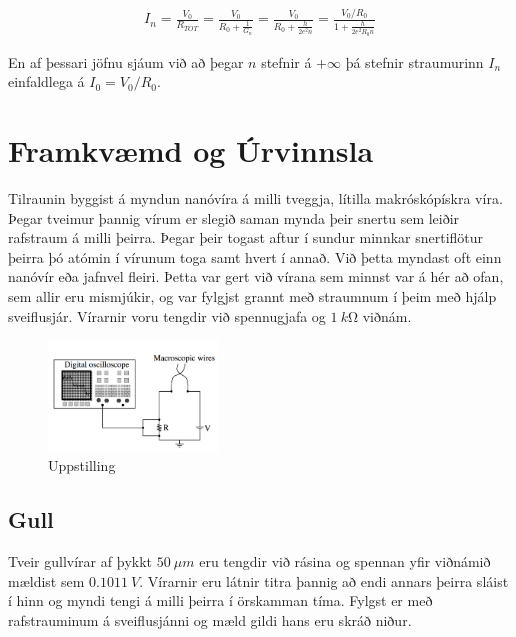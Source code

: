 \documentclass[11pt]{article}
\begin{document}
\begin{align}
I_n = \frac{V_0}{R_{TOT}} = \frac{V_0}{R_0 + \frac{1}{G_n}} = \frac{V_0}{R_0 + \frac{h}{2e^2 n}} = \frac{V_0 / R_0}{1 + \frac{h}{2e^2 R_0 n}}
\end{align}

En af þessari jöfnu sjáum við að þegar $n$ stefnir á $+\infty$ þá stefnir straumurinn $I_n$ einfaldlega á $I_0 = V_0 / R_0$.

\section{Framkvæmd og Úrvinnsla}
Tilraunin byggist á myndun nanóvíra á milli tveggja, lítilla makróskópískra víra. Þegar tveimur þannig vírum er slegið saman mynda þeir snertu sem leiðir rafstraum á milli þeirra. Þegar þeir togast aftur í sundur minnkar snertiflötur þeirra þó atómin í vírunum toga samt hvert í annað. Við þetta myndast oft einn nanóvír eða jafnvel fleiri. Þetta var gert við vírana sem minnst var á hér að ofan, sem allir eru mismjúkir, og var fylgjst grannt með straumnum í þeim með hjálp sveiflusjár. Vírarnir voru tengdir við spennugjafa og $\SI{1}{k \ohm}$ viðnám.
\begin{figure}[H]
    \centering
    \includegraphics[width=0.4\textwidth]{leidni_skyring.PNG}
    \caption{Uppstilling}
    \label{fig:uppstilling}
\end{figure}

\subsection{Gull}
Tveir gullvírar af þykkt $\SI{50}{\mu m}$ eru tengdir við rásina og spennan yfir viðnámið mældist sem $\SI{0.1011}{V}$. Vírarnir eru látnir titra þannig að endi annars þeirra sláist í hinn og myndi tengi á milli þeirra í örskamman tíma. Fylgst er með rafstrauminum á sveiflusjánni og mæld gildi hans eru skráð niður. 
\end{document}
